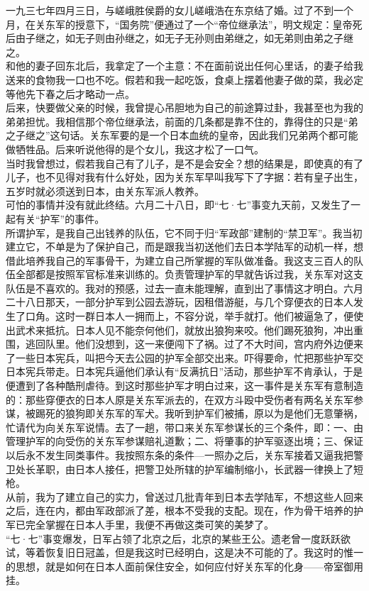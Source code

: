一九三七年四月三日，与嵯峨胜侯爵的女儿嵯峨浩在东京结了婚。过了不到一个月，在关东军的授意下，“国务院”便通过了一个“帝位继承法”，明文规定：皇帝死后由子继之，如无子则由孙继之，如无子无孙则由弟继之，如无弟则由弟之子继之。\\

和他的妻子回东北后，我拿定了一个主意：不在面前说出任何心里话，的妻子给我送来的食物我一口也不吃。假若和我一起吃饭，食桌上摆着他妻子做的菜，我必定等他先下春之后才略动一点。\\

后来，快要做父亲的时候，我曾提心吊胆地为自己的前途算过卦，我甚至也为我的弟弟担忧。我相信那个帝位继承法，前面的几条都是靠不住的，靠得住的只是“弟之子继之”这句话。关东军要的是一个日本血统的皇帝，因此我们兄弟两个都可能做牺牲品。后来听说他得的是个女儿，我这才松了一口气。\\

当时我曾想过，假若我自己有了儿子，是不是会安全？想的结果是，即使真的有了儿子，也不见得对我有什么好处，因为关东军早叫我写下了字据：若有皇子出生，五岁时就必须送到日本，由关东军派人教养。\\

可怕的事情并没有就此终结。六月二十八日，即“七·七”事变九天前，又发生了一起有关“护军”的事件。\\

所谓护军，是我自己出钱养的队伍，它不同于归“军政部”建制的“禁卫军”。我当初建立它，不单是为了保护自己，而是跟我当初送他们去日本学陆军的动机一样，想借此培养我自己的军事骨干，为建立自己所掌握的军队做准备。我这支三百人的队伍全部都是按照军官标准来训练的。负责管理护军的早就告诉过我，关东军对这支队伍是不喜欢的。我对的预感，过去一直未能理解，直到出了事情这才明白。六月二十八日那天，一部分护军到公园去游玩，因租借游艇，与几个穿便衣的日本人发生了口角。这时一群日本人一拥而上，不容分说，举手就打。他们被逼急了，便使出武术来抵抗。日本人见不能奈何他们，就放出狼狗来咬。他们踢死狼狗，冲出重围，逃回队里。他们没想到，这一来便闯下了祸。过了不大时间，宫内府外边便来了一些日本宪兵，叫把今天去公园的护军全部交出来。吓得要命，忙把那些护军交日本宪兵带走。日本宪兵逼他们承认有“反满抗日”活动，那些护军不肯承认，于是便遭到了各种酷刑虐待。到这时那些护军才明白过来，这一事件是关东军有意制造的：那些穿便衣的日本人原是关东军派去的，在双方斗殴中受伤者有两名关东军参谋，被踢死的狼狗即关东军的军犬。我听到护军们被捕，原以为是他们无意肇祸，忙请代为向关东军说情。去了一趟，带口来关东军参谋长的三个条件，即：一、由管理护军的向受伤的关东军参谋赔礼道歉；二、将肇事的护军驱逐出境；三、保证以后永不发生同类事件。我按照东条的条件—一照办之后，关东军接着又逼我把警卫处长革职，由日本人接任，把警卫处所辖的护军编制缩小，长武器一律换上了短枪。\\

从前，我为了建立自己的实力，曾送过几批青年到日本去学陆军，不想这些人回来之后，连在内，都由军政部派了差，根本不受我的支配。现在，作为骨干培养的护军已完全掌握在日本人手里，我便不再做这类可笑的美梦了。\\

“七·七”事变爆发，日军占领了北京之后，北京的某些王公。遗老曾一度跃跃欲试，等着恢复旧日冠盖，但是我这时已经明白，这是决不可能的了。我这时的惟一的思想，就是如何在日本人面前保住安全，如何应付好关东军的化身——帝室御用挂。
